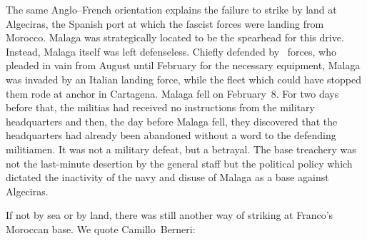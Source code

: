 \indexCNT{}
The same Anglo--French orientation explains the failure to strike by land at Algeciras, the Spanish port at which the fascist forces were landing from Morocco. Malaga was strategically located to be the spearhead for this drive. Instead, Malaga itself was left defenseless. Chiefly defended by \CNT\ forces, who pleaded in vain from August until February for the necessary equipment, Malaga was invaded by an Italian landing force, while the fleet which could have stopped them rode at anchor in Cartagena. Malaga fell on February~8. For two days before that, the militias had received no instructions from the military headquarters and then, the day before Malaga fell, they discovered that the headquarters had already been abandoned without a word to the defending militiamen. It was not a military defeat, but a betrayal. The base treachery was not the last-minute desertion by the general staff but the political policy which dictated the inactivity of the navy and disuse of Malaga as a base against Algeciras.%

If not by sea or by land, there was still another way of striking at Franco’s Moroccan base. We quote Camillo~Berneri:

